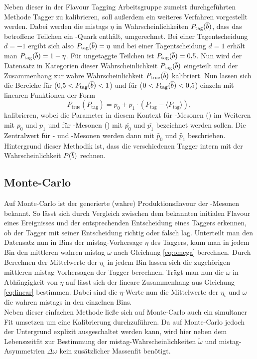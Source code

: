 Neben dieser in der Flavour Tagging Arbeitsgruppe zumeist durchgeführten Methode Tagger zu kalibrieren, soll außerdem ein weiteres Verfahren vorgestellt werden. Dabei werden die mistags $\eta$ in Wahrscheinlichkeiten $P_\text{tag}({\overline {{b}}})$, dass das betroffene Teilchen ein \bquarkbar-Quark enthält, umgerechnet. Bei einer Tagentscheidung $d=-1$ ergibt sich also $P_\text{tag}({\overline {{b}}})=\eta$ und bei einer Tagentscheidung $d=1$ erhält man $P_\text{tag}({\overline {{b}}})=1-\eta$. Für ungetaggte Teilchen ist $P_\text{tag}({\overline {{b}}})=0{,}5$. Nun wird der Datensatz in Kategorien dieser Wahrscheinlichkeit $P_\text{tag}({\overline {{b}}})$ eingeteilt und der Zusammenhang zur wahre Wahrscheinlichkeit $P_\text{true}({\overline {{b}}})$ kalibriert. Nun lassen sich die Bereiche für \bquarkbar ($0{,}5<P_\text{tag}({\overline {{b}}})<1$) und für \bquark ($0<P_\text{tag}({\overline {{b}}})<0{,}5$) einzeln mit linearen Funktionen der Form
\begin{equation}
P_\text{true}(P_\text{tag})=p_0+p_1\cdot\left(P_\text{tag}-\langle P_\text{tag}\rangle\right)\label{eq:linearPB},
\end{equation}
kalibrieren, wobei die Parameter in diesem Kontext für \Bz-Mesonen (\bquarkbar\dquark) im Weiteren mit $p_0$ und $p_1$ und für \Bzb-Mesonen (\bquark\dquarkbar) mit $\overline{p_0}$ und $\overline{p_1}$ bezeichnet werden sollen. Die Zentralwert für \Bz- und \Bzb-Mesonen werden dann mit $\widetilde{p_0}$ und $\widetilde{p_1}$ beschrieben.\\
Hintergrund dieser Methodik ist, dass die verschiedenen Tagger intern mit der Wahrscheinlichkeit $P({\overline {{b}}})$ rechnen.

\subsection{Monte-Carlo}\label{sec:mckalibrierung}

Auf Monte-Carlo ist der generierte (wahre) Produktionsflavour der \B-Mesonen bekannt. So lässt sich durch Vergleich zwischen dem bekannten initialen Flavour eines Ereignisses und der entsprechenden Entscheidung eines Taggers erkennen, ob der Tagger mit seiner Entscheidung richtig oder falsch lag. Unterteilt man den Datensatz nun in Bins der mistag-Vorhersage $\eta$ des Taggers, kann man in jedem Bin den mittleren wahren mistag $\omega$ nach Gleichung \eqref{eq:omega} berechnen. Durch Berechnen der Mittelwerte der $\eta_i$ in jedem Bin lassen sich die zugehörigen mittleren mistag-Vorhersagen der Tagger berechnen. Trägt man nun die $\omega$ in Abhängigkeit von $\eta$ auf lässt sich der lineare Zusammenhang aus Gleichung \eqref{eq:linear} bestimmen. Dabei sind die $\eta$-Werte nun die Mittelwerte der $\eta_i$ und $\omega$ die wahren mistags in den einzelnen Bins.\\
Neben dieser einfachen Methode ließe sich auf Monte-Carlo auch ein simultaner Fit umsetzen um eine Kalibrierung durchzuführen. Da auf Monte-Carlo jedoch der Untergrund explizit ausgeschaltet werden kann, wird hier neben dem Lebenszeitfit zur Bestimmung der mistag-Wahrscheinlichkeiten $\widetilde{\omega}$  und mistag-Asymmetrien $\Delta\omega$ kein zusätzlicher Massenfit benötigt.

